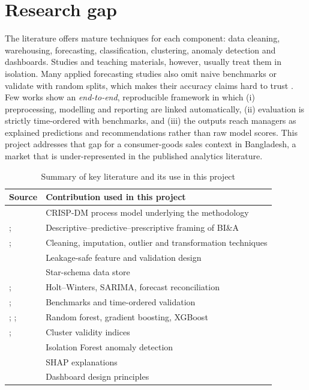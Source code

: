 \section{Research gap}
The literature offers mature techniques for each component: data cleaning, warehousing, forecasting,
classification, clustering, anomaly detection and dashboards. Studies and teaching materials, however, usually
treat them in isolation. Many applied forecasting studies also omit naive benchmarks or validate with random
splits, which makes their accuracy claims hard to trust \citep{makridakis2018, kaufman2012}. Few works show an
\emph{end-to-end}, reproducible framework in which (i) preprocessing, modelling and reporting are linked
automatically, (ii) evaluation is strictly time-ordered with benchmarks, and (iii) the outputs reach managers as
explained predictions and recommendations rather than raw model scores. This project addresses that gap for a
consumer-goods sales context in Bangladesh, a market that is under-represented in the published analytics
literature.

\begin{table}[htbp]\centering\small
\caption{Summary of key literature and its use in this project}\label{tab:litsummary}
\begin{tabularx}{\linewidth}{@{}p{3.6cm}X@{}}
\toprule
\textbf{Source} & \textbf{Contribution used in this project} \\ \midrule
\citet{shearer2000} & CRISP-DM process model underlying the methodology \\
\citet{chen2012}; \citet{sharda2018} & Descriptive--predictive--prescriptive framing of BI\&A \\
\citet{garcia2015}; \citet{han2012} & Cleaning, imputation, outlier and transformation techniques \\
\citet{kaufman2012} & Leakage-safe feature and validation design \\
\citet{kimball2013} & Star-schema data store \\
\citet{hyndman2021}; \citet{winters1960} & Holt--Winters, SARIMA, forecast reconciliation \\
\citet{makridakis2018}; \citet{bergmeir2012} & Benchmarks and time-ordered validation \\
\citet{breiman2001}; \citet{friedman2001}; \citet{chen2016} & Random forest, gradient boosting, XGBoost \\
\citet{rousseeuw1987}; \citet{davies1979} & Cluster validity indices \\
\citet{liu2008} & Isolation Forest anomaly detection \\
\citet{lundberg2017} & SHAP explanations \\
\citet{few2013} & Dashboard design principles \\ \bottomrule
\end{tabularx}
\end{table}

